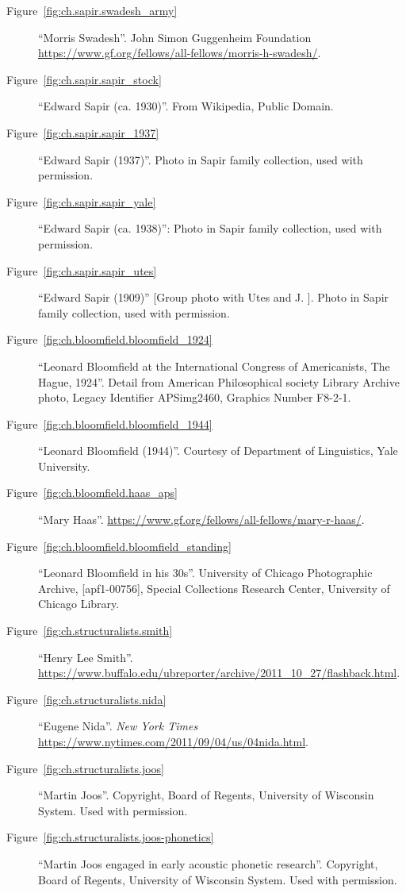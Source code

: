 \begin{description}
\item[Figure~\ref{fig:ch.sapir.swadesh_army}] ``Morris Swadesh''.
  John Simon Guggenheim Foundation
  \url{https://www.gf.org/fellows/all-fellows/morris-h-swadesh/}.
\item[Figure~\ref{fig:ch.sapir.sapir_stock}] ``Edward Sapir
  (ca. 1930)''. From Wikipedia, Public Domain.
\item[Figure~\ref{fig:ch.sapir.sapir_1937}] ``Edward Sapir
  (1937)''. Photo in Sapir family collection, used with permission.
\item[Figure~\ref{fig:ch.sapir.sapir_yale}] ``Edward Sapir (ca. 1938)'':
  Photo in Sapir family collection, used with permission.
\item[Figure~\ref{fig:ch.sapir.sapir_utes}] ``Edward Sapir (1909)''
  {[Group photo with Utes and J. ]}. Photo in Sapir family
  collection, used with permission.
\item[Figure~\ref{fig:ch.bloomfield.bloomfield_1924}] ``Leonard
  Bloomfield at the International Congress of Americanists, The Hague,
  1924''. Detail from American Philosophical society Library Archive
  photo, Legacy Identifier APSimg2460, Graphics Number F8-2-1.
\item[Figure~\ref{fig:ch.bloomfield.bloomfield_1944}] ``Leonard
  Bloomfield (1944)''. Courtesy of Department of Linguistics, Yale
  University.
\item[Figure~\ref{fig:ch.bloomfield.haas_aps}] ``Mary
  Haas''. \url{https://www.gf.org/fellows/all-fellows/mary-r-haas/}.
\item[Figure~\ref{fig:ch.bloomfield.bloomfield_standing}] ``Leonard
  Bloomfield in his 30s''. University of Chicago Photographic Archive,
  [apf1-00756], Special Collections Research Center, University of
  Chicago Library.
\item[Figure~\ref{fig:ch.structuralists.smith}] ``Henry Lee
  Smith''. 
  \url{https://www.buffalo.edu/ubreporter/archive/2011_10_27/flashback.html}.
\item[Figure~\ref{fig:ch.structuralists.nida}] ``Eugene
  Nida''. \textsl{New York Times}
  \url{https://www.nytimes.com/2011/09/04/us/04nida.html}. 
\item[Figure~\ref{fig:ch.structuralists.joos}] ``Martin
  Joos''. Copyright, Board of
  Regents, University of Wisconsin System. Used with permission.
\item[Figure~\ref{fig:ch.structuralists.joos-phonetics}] ``Martin Joos
  engaged in early acoustic phonetic research''. Copyright, Board of
  Regents, University of Wisconsin System. Used with permission.

\end{description}
